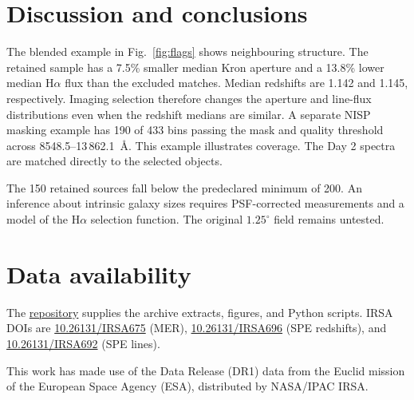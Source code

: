 \documentclass{aa}
\begin{document}
\section{Discussion and conclusions}
The blended example in Fig.~\ref{fig:flags} shows neighbouring structure. The retained sample has a 7.5\% smaller median Kron aperture and a 13.8\% lower median H$\alpha$ flux than the excluded matches. Median redshifts are 1.142 and 1.145, respectively. Imaging selection therefore changes the aperture and line-flux distributions even when the redshift medians are similar. A separate NISP masking example has 190 of 433 bins passing the mask and quality threshold across 8548.5--13\,862.1~\AA. This example illustrates coverage. The Day 2 spectra are matched directly to the selected objects.

The 150 retained sources fall below the predeclared minimum of 200. An inference about intrinsic galaxy sizes requires PSF-corrected measurements and a model of the H$\alpha$ selection function. The original $1.25^{\circ}$ field remains untested.

\section*{Data availability}
The \href{https://github.com/Biswajit1999/daily-astro-notebooks/tree/master/euclid-dr1-foundation/2026-11-14-day01}{repository} supplies the archive extracts, figures, and Python scripts. IRSA DOIs are \href{https://doi.org/10.26131/IRSA675}{10.26131/IRSA675} (MER), \href{https://doi.org/10.26131/IRSA696}{10.26131/IRSA696} (SPE redshifts), and \href{https://doi.org/10.26131/IRSA692}{10.26131/IRSA692} (SPE lines).
\begin{acknowledgements}
This work has made use of the Data Release (DR1) data from the Euclid mission of the European Space Agency (ESA), distributed by NASA/IPAC IRSA.
\end{acknowledgements}


\end{document}
